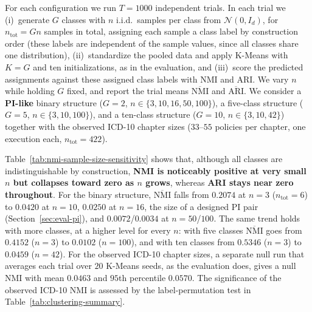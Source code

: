 For each configuration we run $T=1000$ independent trials.
In each trial we
(i)~generate $G$ classes with $n$ i.i.d.\ samples per class from $\mathcal{N}(0,I_d)$, for $n_{\mathrm{tot}}=Gn$ samples in total, assigning each sample a class label by construction order (these labels are independent of the sample values, since all classes share one distribution),
(ii)~standardize the pooled data and apply K-Means with $K=G$ and ten initializations, as in the evaluation, and
(iii)~score the predicted assignments against these assigned class labels with NMI and ARI.
We vary $n$ while holding $G$ fixed, and report the trial means $\overline{\mathrm{NMI}}$ and $\overline{\mathrm{ARI}}$.
We consider a \textbf{PI-like} binary structure ($G=2$, $n\in\{3,10,16,50,100\}$), a five-class structure ($G=5$, $n\in\{3,10,100\}$), and a ten-class structure ($G=10$, $n\in\{3,10,42\}$) together with the observed ICD-10 chapter sizes ($33$--$55$ policies per chapter, one execution each, $n_{\mathrm{tot}}=422$).

Table~\ref{tab:nmi-sample-size-sensitivity} shows that, although all classes are indistinguishable by construction, \textbf{NMI is noticeably positive at very small $n$ but collapses toward zero as $n$ grows}, whereas \textbf{ARI stays near zero throughout}.
For the binary structure, $\overline{\mathrm{NMI}}$ falls from $0.2074$ at $n=3$ ($n_{\mathrm{tot}}=6$) to $0.0420$ at $n=10$, $0.0250$ at $n=16$, the size of a designed PI pair (Section~\ref{sec:eval-pi}), and $0.0072$/$0.0034$ at $n=50$/$100$.
The same trend holds with more classes, at a higher level for every $n$: with five classes $\overline{\mathrm{NMI}}$ goes from $0.4152$ ($n=3$) to $0.0102$ ($n=100$), and with ten classes from $0.5346$ ($n=3$) to $0.0459$ ($n=42$).
For the observed ICD-10 chapter sizes, a separate null run that averages each trial over $20$ K-Means seeds, as the evaluation does, gives a null NMI with mean $0.0463$ and $95$th percentile $0.0570$.
The significance of the observed ICD-10 NMI is assessed by the label-permutation test in Table~\ref{tab:clustering-summary}.
